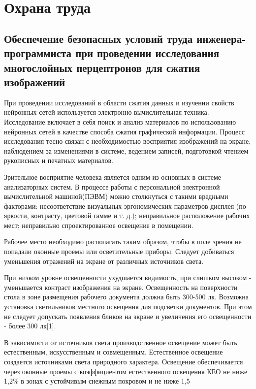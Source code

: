 \section{Охрана труда}

\subsection{Обеспечение безопасных условий труда инженера-программиста при проведении исследования многослойных перцептронов для сжатия изображений}

При проведении исследований в области сжатия данных и изучении свойств нейронных сетей используется электронно-вычислительная техника.
Исследование включает в себя поиск и анализ материалов по использованию нейронных сетей в качестве способа сжатия графической информации.
Процесс исследования тесно связан с необходимостью восприятия изображений на экране, наблюдением за изменениями в системе, ведением записей, подготовкой чтением рукописных и печатных материалов.

Зрительное восприятие человека является одним из основных в системе анализаторных систем.
В процессе работы с персональной электронной вычислительной машиной(ПЭВМ) можно столкнуться с такими вредными факторами: несоответствие визуальных эргономических параметров дисплея (по яркости, контрасту, цветовой гамме и т. д.); неправильное расположение рабочих мест; неправильно спроектированное освещение в помещении.

Рабочее место необходимо располагать таким образом, чтобы в поле зрения не попадали оконные проемы или осветительные приборы. Следует добиваться уменьшения отражений на экране от различных источников света.

При низком уровне освещенности ухудшается видимость, при слишком высоком - уменьшается контраст изображения на экране.
Освещенность на поверхности стола в зоне размещения рабочего документа должна быть 300-500 лк.
Возможна установка светильников местного освещения для подсветки документов.
При этом не следует допускать появления бликов на экране и увеличения его освещенности - более 300 лк[1].

В зависимости от источников света производственное освещение может быть естественным, искусственным и совмещенным.
Естественное освещение создается источниками света природного характера.
Освещение обеспечивается через оконные проемы с коэффициентом естественного освещения КЕО не ниже 1,2\% в зонах с устойчивым снежным покровом и не ниже 1,5%

